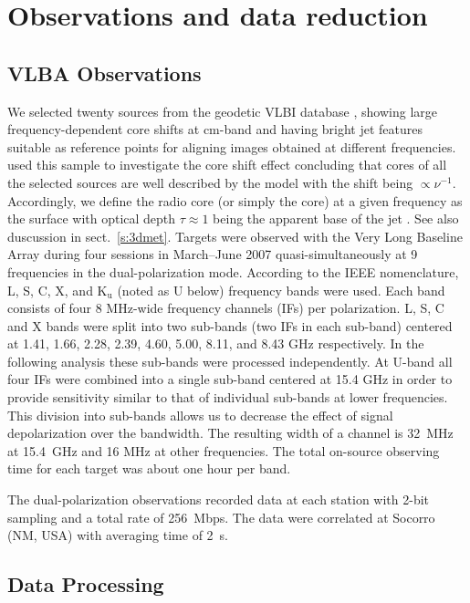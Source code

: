 \documentclass[a4paper,fleqn,usenatbib,useAMS]{mnras}
\begin{document}
\section{Observations and data reduction}\label{s:obs}
\subsection{VLBA Observations}\label{s:obs1}

We selected twenty sources from the geodetic VLBI database \citep{fey_charlot_97,petrov_etal09}, showing large frequency-dependent core shifts at cm-band and having bright jet features suitable as reference points for aligning images obtained at different frequencies. 
\citet{sokolovsky_etal11} used this sample to investigate the core shift effect concluding that cores of all the selected sources are well described by the \citet{blandford_konigl_79} model with the shift being $\propto\nu^{-1}$.
Accordingly, we define the radio core (or simply the core) at a given frequency as the surface with optical depth $\tau\approx1$ being the apparent base of the jet \citep{marscher08}. 
See also duscussion in sect.~\ref{s:3dmet}.
Targets were observed with the Very Long Baseline Array during four sessions in March--June 2007 \citep{sokolovsky_etal11} quasi-simultaneously at 9 frequencies in the dual-polarization mode. 
According to the IEEE nomenclature, L, S, C, X, and $\mathrm{K}_\mathrm{u}$ (noted as U below) 
frequency bands were used. Each band consists of four 8 MHz-wide frequency channels (IFs) per polarization. 
L, S, C and X bands were split into two sub-bands (two IFs in each sub-band) centered at 1.41, 1.66, 2.28, 2.39, 4.60, 5.00, 8.11, and 8.43 GHz respectively. 
In the following analysis these sub-bands were processed independently. 
At U-band all four IFs were combined into a single sub-band centered at 15.4 GHz in order to provide sensitivity similar to that of individual sub-bands at lower frequencies.
This division into sub-bands allows us to decrease the effect of signal depolarization over the bandwidth. 
The resulting width of a channel is 32~MHz at 15.4~GHz and 16 MHz at other frequencies.
The total on-source observing time for each target was about one hour per band.

The dual-polarization observations recorded data at each station with 2-bit sampling and a total rate of 256~Mbps.
The data were correlated at Socorro (NM, USA) with averaging time of 2~s.


\subsection{Data Processing}
\end{document}

